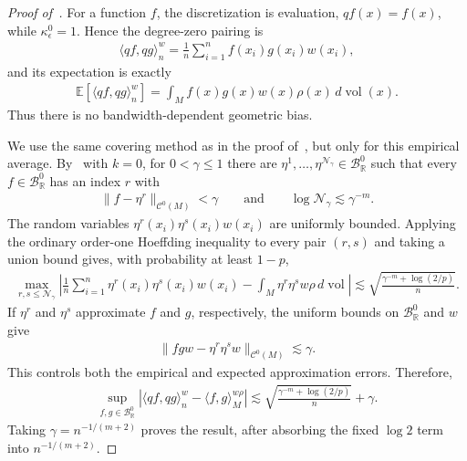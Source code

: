 \documentclass[11pt,reqno]{amsproc}
\numberwithin{equation}{section}
\newcommand{\R}{\mathbb{R}}
\newcommand{\E}{\mathbb{E}}
\newcommand{\cN}{\mathcal{N}}
\newcommand{\cB}{\mathcal{B}}
\newcommand{\cC}{\mathcal{C}}
\newcommand{\ls}{\lesssim}
\newcommand{\vol}{\operatorname{vol}}
\newcommand{\dvol}{d\!\vol}
\theoremstyle{definition}
\theoremstyle{plain}
\begin{document}
\begin{proof}[Proof of~]
    For a function $f$, the discretization is evaluation, $qf(x)=f(x)$, while $\kappa^0_\epsilon=1$. Hence the degree-zero pairing is
    \begin{align}
        \langle qf,qg\rangle_n^w
        =\frac1n\sum_{i=1}^n f(x_i)g(x_i)w(x_i),
    \end{align}
    and its expectation is exactly
    \begin{align}
        \E[\langle qf,qg\rangle_n^w]
        =\int_M f(x)g(x)w(x)\rho(x)\,\dvol(x).
    \end{align}
    Thus there is no bandwidth-dependent geometric bias.

    We use the same covering method as in the proof of~, but only for this empirical average. By~ with $k=0$, for $0<\gamma\leq1$ there are $\eta^1,\ldots,\eta^{\cN_\gamma}\in\cB_\R^0$ such that every $f\in\cB_\R^0$ has an index $r$ with
    \begin{align}
        \|f-\eta^r\|_{\cC^0(M)}<\gamma
        \qquad\text{and}\qquad
        \log\cN_\gamma\ls\gamma^{-m}.
    \end{align}
    The random variables $\eta^r(x_i)\eta^s(x_i)w(x_i)$ are uniformly bounded. Applying the ordinary order-one Hoeffding inequality to every pair $(r,s)$ and taking a union bound gives, with probability at least $1-p$,
    \begin{align}
        \max_{r,s\leq\cN_\gamma}
        \left|
        \frac1n\sum_{i=1}^n\eta^r(x_i)\eta^s(x_i)w(x_i)
        -\int_M\eta^r\eta^s w\rho\,\dvol
        \right|
        \ls
        \sqrt{\frac{\gamma^{-m}+\log(2/p)}{n}}.
    \end{align}
    If $\eta^r$ and $\eta^s$ approximate $f$ and $g$, respectively, the uniform bounds on $\cB_\R^0$ and $w$ give
    \begin{align}
        \|fgw-\eta^r\eta^s w\|_{\cC^0(M)}\ls\gamma.
    \end{align}
    This controls both the empirical and expected approximation errors. Therefore,
    \begin{align}
        \sup_{f,g\in\cB_\R^0}
        \left|
        \langle qf,qg\rangle_n^w-\langle f,g\rangle_M^{w\rho}
        \right|
        \ls
        \sqrt{\frac{\gamma^{-m}+\log(2/p)}{n}}+\gamma.
    \end{align}
    Taking $\gamma=n^{-1/(m+2)}$ proves the result, after absorbing the fixed $\log 2$ term into $n^{-1/(m+2)}$.
\end{proof}
\end{document}
